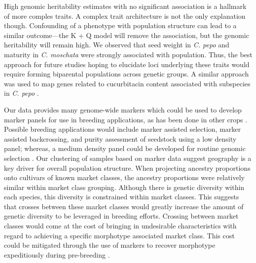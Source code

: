 \documentclass[utf8]{FrontiersinHarvard} %
\begin{document}
High genomic heritability estimates with no significant association is a hallmark of more comples traits. A complex trait architecture is not the only explanation though. Confounding of a phenotype with population structure can lead to a similar outcome---the K + Q model will remove the association, but the genomic heritability will remain high. We observed that seed weight in \textit{C. pepo} and maturity in \textit{C. moschata} were strongly associated with population. Thus, the best approach for future studies hoping to elucidate loci underlying these traits would require forming biparental populations across genetic groups. A similar approach was used to map genes related to cucurbitacin content associated with subspecies in \textit{C. pepo} \citep{Brzozowski2020}.

Our data provides many genome-wide markers which could be used to develop marker panels for use in breeding applications, as has been done in other crops \citep{Arbelaez2019}. Possible breeding applications would include marker assisted selection, marker assisted backcrossing, and purity assessment of seedstock using a low density panel; whereas, a medium density panel could be developed for routine genomic selection \citep{Cerioli2022}. Our clustering of samples based on marker data suggest geography is a key driver for overall population structure. When projecting ancestry proportions onto cultivars of known market classes, the ancestry proportions were relatively similar within market class grouping. Although there is genetic diversity within each species, this diversity is constrained within market classes. This suggests that crosses between these market classes would greatly increase the amount of genetic diversity to be leveraged in breeding efforts. Crossing between market classes would come at the cost of bringing in undesirable characteristics with regard to achieving a specific morphotype associated market class. This cost could be mitigated through the use of markers to recover morphotype expeditiously during pre-breeding \citep{Cobb2019}. 
\end{document}
